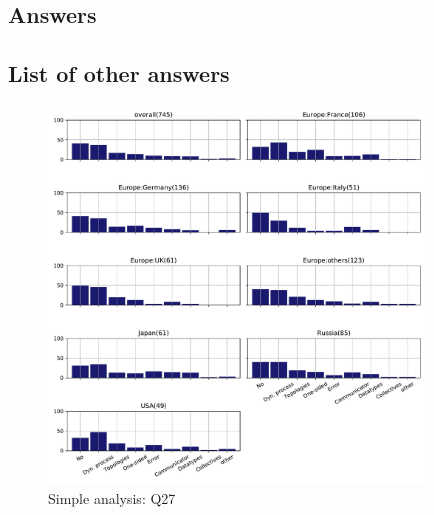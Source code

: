 
\subsection{Answers}


\subsection{List of other answers}
\begin{itemize}

\end{itemize}

\begin{figure}[htb]
\begin{center}
\includegraphics[width=10cm]{../pdfs/Q27.pdf}
\caption{Simple analysis: Q27}
\label{fig:Q27}
\end{center}
\end{figure}
